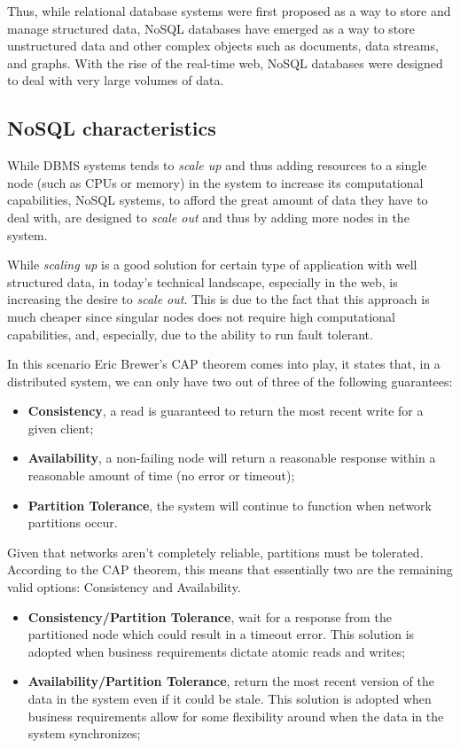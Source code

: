 \noindent Thus, while relational database systems were first proposed as a way to store and manage structured data, NoSQL databases have emerged as a way to store unstructured data and other complex objects such as documents, data streams, and graphs. With the rise of the real-time web, NoSQL databases were designed to deal with very large volumes of data.

\subsection{NoSQL characteristics}
While DBMS systems tends to \textit{scale up} and thus adding resources to a single node (such as CPUs or memory) in the system to increase its computational capabilities, NoSQL systems, to afford the great amount of data they have to deal with, are designed to \textit{scale out} and thus by adding more nodes in the system.

\noindent While \textit{scaling up} is a good solution for certain type of application with well structured data, in today's technical landscape, especially in the web, is increasing the desire to \textit{scale out}. This is due to the fact that this approach is much cheaper since singular nodes does not require high computational capabilities, and, especially, due to the ability to run fault tolerant.

\noindent In this scenario Eric Brewer's CAP theorem comes into play, it states that, in a distributed system, we can only have two out of three of the following guarantees:
\begin{itemize}
\item \textbf{Consistency}, a read is guaranteed to return the most recent write for a given client;
\item \textbf{Availability}, a non-failing node will return a reasonable response within a reasonable amount of time (no error or timeout);
\item \textbf{Partition Tolerance}, the system will continue to function when network partitions occur.
\end{itemize}

\noindent Given that networks aren't completely reliable, partitions must be tolerated. According to the CAP theorem, this means that essentially two are the remaining valid options: Consistency and Availability.
\begin{itemize}
\item \textbf{Consistency/Partition Tolerance}, wait for a response from the partitioned node which could result in a timeout error. This solution is adopted when business requirements dictate atomic reads and writes;
\item \textbf{Availability/Partition Tolerance}, return the most recent version of the data in the system even if it could be stale. This solution is adopted when business requirements allow for some flexibility around when the data in the system synchronizes;
\end{itemize}

